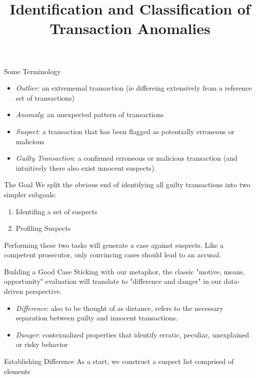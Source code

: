 \documentclass[aspectratio=169]{beamer}
\title[Transaction Anomaly Detection]{Identification and Classification of Transaction Anomalies}
\institute{Applying isolation outlier detection and topological profiling to GL Transaction data.}
\begin{document}
  \begin{frame}
  \setlength {\marginparwidth }{2cm}
    \titlepage
  \end{frame}

\begin{frame}{Some Terminology}
  \begin{itemize}
    \item \textit{Outlier}: an extrememal transaction (ie differeing extensively from a reference set of transactions) 
    \item \textit{Anomaly}: an unexpected pattern of transactions
    \item \textit{Suspect}: a transaction that has been flagged as potentially erroneous or malicious
    \item \textit{Guilty Transaction}: a confirmed erroneous or malicious transaction (and intuitively there also exist innocent suspects).
  \end{itemize}
\end{frame}

\begin{frame}{The Goal}
We split the obvious end of identifying all guilty transactions into two simpler subgoals: 
\begin{enumerate}
  \item Identifing a set of suspects 
  \item Profiling Suspects 
\end{enumerate}
Performing these two tasks will generate a case against suspects. Like a competent prosecutor, only convincing cases should 
lead to an accusal. 
\end{frame}
  \begin{frame}{Building a Good Case}
    Sticking with our metaphor, the classic "motive, means, opportunity" evaluation
    will translate to "difference and danger" in our data-driven perspective. 
    \begin{itemize}
      \item \textit{Difference}: also to be thought of as distance, refers to the necessary 
      separation between guilty and innocent transactions.  
      \item \textit{Danger}: contexualized properties that identify erratic, peculiar, 
    unexplained or risky behavior    
    \end{itemize}
    
  \end{frame}

  \begin{frame}{Establishing Difference}
    As a start, we construct a suspect list comprised of elements 
  \end{frame}
\end{document}
